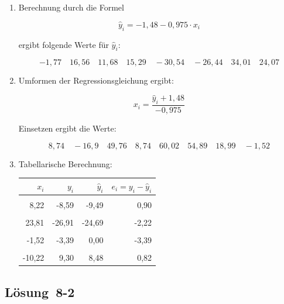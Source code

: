 \documentclass[
  11pt,
  ngerman,
  a4paper,
]{report}
\begin{document}
\begin{enumerate}
\def\labelenumi{\alph{enumi})}
\item
  Berechnung durch die Formel

  \[\hat{y}_i=-1{,}48-0{,}975\cdot x_i\]

  ergibt folgende Werte für \(\hat{y}_i\):

  \[ -1{,}77\quad16{,}56\quad11{,}68\quad15{,}29\quad-30{,}54\quad-26{,}44\quad34{,}01\quad24{,}07 \]
\item
  Umformen der Regressionsgleichung ergibt:

  \[x_i=\frac{\hat{y}_i+1,48}{-0,975}\]

  Einsetzen ergibt die Werte:

  \[8{,}74\quad-16{,}9\quad49{,}76\quad8{,}74\quad60{,}02\quad54{,}89\quad18{,}99\quad-1{,}52\]
\item
  Tabellarische Berechnung:

  \begin{table}[H]
   \centering
   \begin{tabular}{rrrr}
   \toprule
   \textbf{$x_i$} & \textbf{$y_i$} & \textbf{$\hat{y}_i$} & \textbf{$e_i=y_i-\hat{y}_i$}\\
   \midrule
   \cellcolor{gray!6}{-11,49} & \cellcolor{gray!6}{6,82} & \cellcolor{gray!6}{9,72} & \cellcolor{gray!6}{-2,90}\\
   8,22 & -8,59 & -9,49 & 0,90\\
   \cellcolor{gray!6}{-25,66} & \cellcolor{gray!6}{25,92} & \cellcolor{gray!6}{23,54} & \cellcolor{gray!6}{2,38}\\
   23,81 & -26,91 & -24,69 & -2,22\\
   \cellcolor{gray!6}{-3,14} & \cellcolor{gray!6}{4,41} & \cellcolor{gray!6}{1,58} & \cellcolor{gray!6}{2,83}\\
   -1,52 & -3,39 & 0,00 & -3,39\\
   \cellcolor{gray!6}{20,15} & \cellcolor{gray!6}{-19,89} & \cellcolor{gray!6}{-21,13} & \cellcolor{gray!6}{1,24}\\
   -10,22 & 9,30 & 8,48 & 0,82\\
   \bottomrule
   \end{tabular}
   \end{table}
\end{enumerate}

\hypertarget{loesung-8-2}{%
\subsection{Lösung~8-2}\label{loesung-8-2}}
\end{document}

